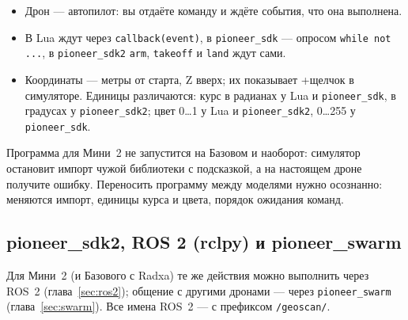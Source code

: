 \begin{infobox}
\begin{itemize}
    \item Дрон --- автопилот: вы отдаёте команду и ждёте события, что она выполнена.
    \item В Lua ждут через \texttt{callback(event)}, в \texttt{pioneer\_sdk} --- опросом \texttt{while not ...}, в \texttt{pioneer\_sdk2} \texttt{arm}, \texttt{takeoff} и \texttt{land} ждут сами.
    \item Координаты --- метры от старта, Z вверх; их показывает +щелчок в симуляторе. Единицы различаются: курс в радианах у Lua и \texttt{pioneer\_sdk}, в градусах у \texttt{pioneer\_sdk2}; цвет 0…1 у Lua и \texttt{pioneer\_sdk2}, 0…255 у \texttt{pioneer\_sdk}.
\end{itemize}
\end{infobox}

\begin{warnbox}
Программа для Мини~2 не запустится на Базовом и наоборот: симулятор остановит импорт чужой библиотеки с подсказкой, а на настоящем дроне получите ошибку. Переносить программу между моделями нужно осознанно: меняются импорт, единицы курса и цвета, порядок ожидания команд.
\end{warnbox}

\subsection*{pioneer\_sdk2, ROS 2 (rclpy) и pioneer\_swarm}

Для Мини~2 (и Базового с Radxa) те же действия можно выполнить через ROS~2 (глава~\ref{sec:ros2}); общение с другими дронами --- через \texttt{pioneer\_swarm} (глава~\ref{sec:swarm}). Все имена ROS~2 --- с префиксом \texttt{/geoscan/}.


